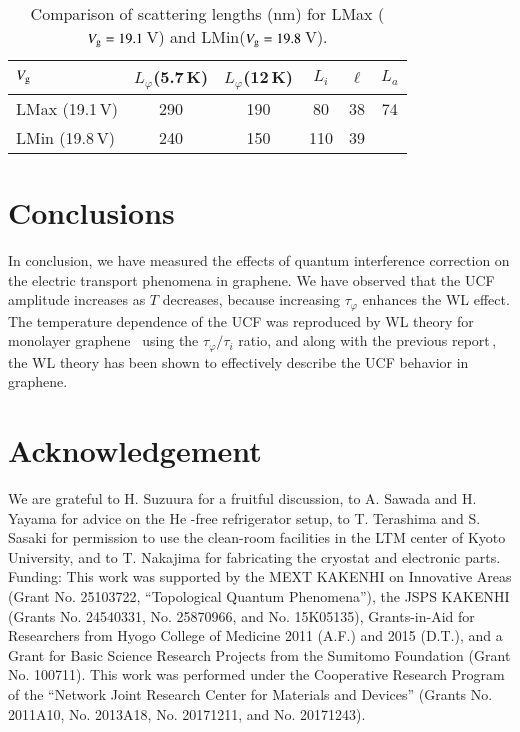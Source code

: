 \documentclass[final,5p,times,twocolumn]{elsarticle}
\begin{document}

\begin{table} [t]
\caption{\label{tab1}Comparison of scattering lengths (nm) for LMax ($V_{\rm g}=19.1$\,V) and LMin($V_{\rm g}=19.8$\,V). }
\begin{center}
\begin{tabular}{l|cccc|c} \hline\hline
$V_{\rm g}$ &  $L_\varphi$\scriptsize{(5.7\,K)}  & $L_\varphi$\scriptsize{(12\,K)}&  $L_i$ &  $\ell$  & $L_a$ \\ \hline
 LMax (19.1\,V) &  290  & 190 & 80 & 38    &74   \\ \cline{1-5}
 LMin (19.8\,V) &  240  & 150 & 110 & 39  &  \\ \hline\hline
\end{tabular}
\end{center}
\end{table}


\section{Conclusions}

In conclusion, we have measured the effects of quantum interference correction on the electric transport phenomena in graphene.
We have observed that the UCF amplitude increases as $T$ decreases, because increasing $\tau_\varphi$ enhances the WL effect.
The temperature dependence of the UCF was reproduced by WL theory for monolayer graphene \,\cite{McCann} using the $\tau_\varphi/\tau_i$ ratio, and along with the previous report\,\cite{GrWL}, the WL theory has been shown to effectively describe the UCF behavior in graphene.


\section{Acknowledgement}

We are grateful to H. Suzuura for a fruitful discussion, to A. Sawada and H. Yayama for advice on the He -free refrigerator setup, to T. Terashima and S. Sasaki for permission to use the clean-room facilities in the LTM center of Kyoto University, and to T. Nakajima for fabricating the cryostat and electronic parts.
Funding: This work was supported by the MEXT KAKENHI on Innovative Areas (Grant No. 25103722, “Topological Quantum Phenomena”), the JSPS KAKENHI (Grants No. 24540331, No. 25870966, and No. 15K05135), Grants-in-Aid for Researchers from Hyogo College of Medicine 2011 (A.F.) and 2015 (D.T.), and a Grant for Basic Science Research Projects from the Sumitomo Foundation (Grant No. 100711). This work was performed under the Cooperative Research Program of the “Network Joint Research Center for Materials and Devices” (Grants No. 2011A10, No. 2013A18, No. 20171211, and No. 20171243).
\end{document}
